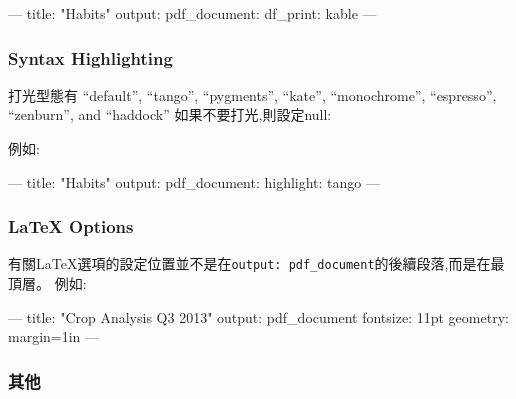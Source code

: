\documentclass[]{book}
\newenvironment{Shaded}{\begin{snugshade}}{\end{snugshade}}
\newcommand{\AttributeTok}[1]{\textcolor[rgb]{0.77,0.63,0.00}{#1}}
\newcommand{\FunctionTok}[1]{\textcolor[rgb]{0.00,0.00,0.00}{#1}}
\newcommand{\OtherTok}[1]{\textcolor[rgb]{0.56,0.35,0.01}{#1}}
\newcommand{\StringTok}[1]{\textcolor[rgb]{0.31,0.60,0.02}{#1}}
\theoremstyle{definition}
\theoremstyle{definition}
\theoremstyle{definition}
\theoremstyle{remark}
\begin{document}
\begin{Shaded}
\begin{Highlighting}[]
\OtherTok{---}
\FunctionTok{title:}\AttributeTok{ }\StringTok{"Habits"}
\FunctionTok{output:}
  \FunctionTok{pdf_document:}
    \FunctionTok{df_print:}\AttributeTok{ kable}
\OtherTok{---}
\end{Highlighting}
\end{Shaded}

\hypertarget{syntax-highlighting}{%
\subsubsection{Syntax Highlighting}\label{syntax-highlighting}}

打光型態有 ``default'', ``tango'', ``pygments'', ``kate'',
``monochrome'', ``espresso'', ``zenburn'', and ``haddock''
如果不要打光,則設定null:

例如:

\begin{Shaded}
\begin{Highlighting}[]
\OtherTok{---}
\FunctionTok{title:}\AttributeTok{ }\StringTok{"Habits"}
\FunctionTok{output:}
  \FunctionTok{pdf_document:}
    \FunctionTok{highlight:}\AttributeTok{ tango}
\OtherTok{---}
\end{Highlighting}
\end{Shaded}

\hypertarget{latex-options}{%
\subsubsection{LaTeX Options}\label{latex-options}}

有關LaTeX選項的設定位置並不是在\texttt{output:\ pdf\_document}的後續段落,而是在最頂層。
例如:

\begin{Shaded}
\begin{Highlighting}[]
\OtherTok{---}
\FunctionTok{title:}\AttributeTok{ }\StringTok{"Crop Analysis Q3 2013"}
\FunctionTok{output:}\AttributeTok{ pdf_document}
\FunctionTok{fontsize:}\AttributeTok{ 11pt}
\FunctionTok{geometry:}\AttributeTok{ margin=1in}
\OtherTok{---}
\end{Highlighting}
\end{Shaded}

\subsubsection{其他}
\end{document}
